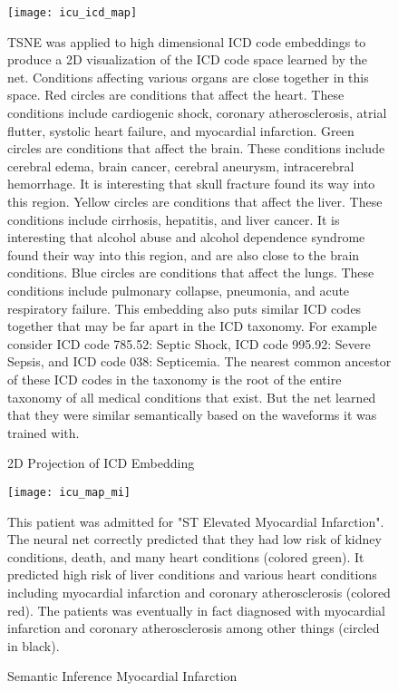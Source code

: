 \begin{figure}
\texttt{[image: icu\_icd\_map]}
\caption{2D Projection of ICD Embedding}
\vspace{12px}
TSNE was applied to high dimensional ICD code embeddings to produce a 2D visualization of the ICD code space learned by the net.  Conditions affecting various organs are close together in this space.  Red circles are conditions that affect the heart.  These conditions include cardiogenic shock, coronary atherosclerosis, atrial flutter, systolic heart failure, and myocardial infarction.  Green circles are conditions that affect the brain.  These conditions include cerebral edema, brain cancer, cerebral aneurysm, intracerebral hemorrhage.  It is interesting that skull fracture found its way into this region.  Yellow circles are conditions that affect the liver.  These conditions include cirrhosis, hepatitis, and liver cancer.  It is interesting that alcohol abuse and alcohol dependence syndrome found their way into this region, and are also close to the brain conditions.  Blue circles are conditions that affect the lungs.  These conditions include pulmonary collapse, pneumonia, and acute respiratory failure.  This embedding also puts similar ICD codes together that may be far apart in the ICD taxonomy.  For example consider ICD code 785.52: Septic Shock, ICD code 995.92: Severe Sepsis, and ICD code 038: Septicemia.  The nearest common ancestor of these ICD codes in the taxonomy is the root of the entire taxonomy of all medical conditions that exist.  But the net learned that they were similar semantically based on the waveforms it was trained with.
\label{fig:icu_icd_map}
\end{figure}

\begin{figure}
\texttt{[image: icu\_map\_mi]}
\caption{Semantic Inference Myocardial Infarction}
\vspace{12px}
This patient was admitted for "ST Elevated Myocardial Infarction".  The neural net correctly predicted that they had low risk of kidney conditions, death, and many heart conditions (colored green).  It predicted high risk of liver conditions and various heart conditions including myocardial infarction and coronary atherosclerosis (colored red).  The patients was eventually in fact diagnosed with myocardial infarction and coronary atherosclerosis among other things (circled in black).
\label{fig:icu_map_mi}
\end{figure}

